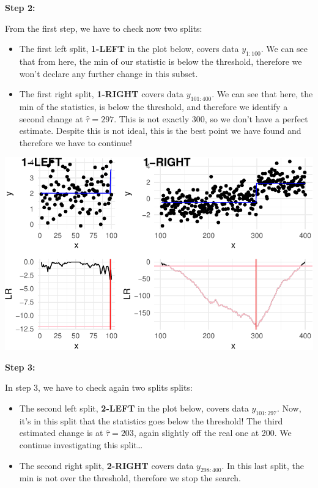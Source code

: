 \documentclass[
  letterpaper,
  DIV=11,
  numbers=noendperiod]{scrreprt}
\begin{document}
\textbf{Step 2:}

From the first step, we have to check now two splits:

\begin{itemize}
\item
  The first left split, \textbf{1-LEFT} in the plot below, covers data
  \(y_{1:100}\). We can see that from here, the min of our statistic is
  below the threshold, therefore we won't declare any further change in
  this subset.
\item
  The first right split, \textbf{1-RIGHT} covers data \(y_{101:400}\).
  We can see that here, the min of the statistics, is below the
  threshold, and therefore we identify a second change at
  \(\hat\tau = 297\). This is not exactly 300, so we don't have a
  perfect estimate. Despite this is not ideal, this is the best point we
  have found and therefore we have to continue!
\end{itemize}

\includegraphics{3_multiple_changes_files/figure-pdf/unnamed-chunk-9-1.pdf}

\textbf{Step 3:}

In step 3, we have to check again two splits splits:

\begin{itemize}
\item
  The second left split, \textbf{2-LEFT} in the plot below, covers data
  \(y_{101:297}\). Now, it's in this split that the statistics goes
  below the threshold! The third estimated change is at
  \(\hat\tau = 203\), again slightly off the real one at 200. We
  continue investigating this split\ldots{}
\item
  The second right split, \textbf{2-RIGHT} covers data \(y_{298:400}\).
  In this last split, the min is not over the threshold, therefore we
  stop the search.
\end{itemize}
\end{document}

